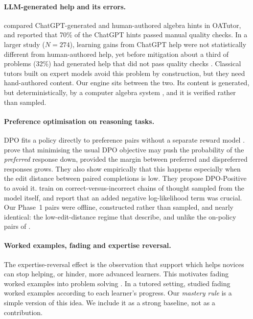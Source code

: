 \documentclass[11pt,a4paper]{article}
\begin{document}
\paragraph{LLM-generated help and its errors.}
\citet{pardos2023learning} compared ChatGPT-generated and human-authored algebra hints in
OATutor, and reported that 70\% of the ChatGPT hints passed manual quality checks. In a
larger study ($N = 274$), learning gains from ChatGPT help were not statistically different
from human-authored help, yet before mitigation about a third of problems (32\%) had
generated help that did not pass quality checks \citep{pardos2024chatgpt}. Classical tutors built on expert models avoid this
problem by construction, but they need hand-authored content. Our engine sits between the
two. Its content is generated, but deterministically, by a computer algebra system
\citep{meurer2017sympy}, and it is verified rather than sampled.

\paragraph{Preference optimisation on reasoning tasks.}
DPO fits a policy directly to preference pairs without a separate reward model
\citep{rafailov2023direct}. \citet{pal2024smaug} prove that minimising the usual DPO
objective may push the probability of the \emph{preferred} response down, provided the margin
between preferred and dispreferred responses grows. They also show empirically that this
happens especially when the edit distance between paired completions is low. They propose
DPO-Positive to avoid it. \citet{pang2024iterative} train on correct-versus-incorrect
chains of thought sampled from the model itself, and report that an added negative
log-likelihood term was crucial. Our Phase~1 pairs were offline, constructed rather than
sampled, and nearly identical: the low-edit-distance regime that \citet{pal2024smaug}
describe, and unlike the on-policy pairs of \citet{pang2024iterative}.

\paragraph{Worked examples, fading and expertise reversal.}
The expertise-reversal effect \citep{kalyuga2003expertise} is the observation that support
which helps novices can stop helping, or hinder, more advanced learners. This motivates
fading worked examples into problem solving \citep{renkl2003structuring}. In a tutored
setting, \citet{salden2010expertise} studied fading worked examples according to each
learner's progress. Our \emph{mastery rule} is a simple version of this idea. We include it
as a strong baseline, not as a contribution.
\end{document}
